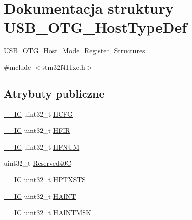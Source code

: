 \hypertarget{struct_u_s_b___o_t_g___host_type_def}{}\section{Dokumentacja struktury U\+S\+B\+\_\+\+O\+T\+G\+\_\+\+Host\+Type\+Def}
\label{struct_u_s_b___o_t_g___host_type_def}


U\+S\+B\+\_\+\+O\+T\+G\+\_\+\+Host\+\_\+\+Mode\+\_\+\+Register\+\_\+\+Structures.  




{\ttfamily \#include $<$stm32f411xe.\+h$>$}

\subsection*{Atrybuty publiczne}
\begin{DoxyCompactItemize}
\item 
\hyperlink{core__sc300_8h_aec43007d9998a0a0e01faede4133d6be}{\+\_\+\+\_\+\+IO} uint32\+\_\+t \hyperlink{struct_u_s_b___o_t_g___host_type_def_ab44a72e139c005445aac54e866f7750f}{H\+C\+FG}
\item 
\hyperlink{core__sc300_8h_aec43007d9998a0a0e01faede4133d6be}{\+\_\+\+\_\+\+IO} uint32\+\_\+t \hyperlink{struct_u_s_b___o_t_g___host_type_def_a509fd299e7540892623954ea4dc1313c}{H\+F\+IR}
\item 
\hyperlink{core__sc300_8h_aec43007d9998a0a0e01faede4133d6be}{\+\_\+\+\_\+\+IO} uint32\+\_\+t \hyperlink{struct_u_s_b___o_t_g___host_type_def_ab4f17f7ef96cf4933e30b1950925c613}{H\+F\+N\+UM}
\item 
uint32\+\_\+t \hyperlink{struct_u_s_b___o_t_g___host_type_def_a0d4a262443e6d12c065adcafabf787ee}{Reserved40C}
\item 
\hyperlink{core__sc300_8h_aec43007d9998a0a0e01faede4133d6be}{\+\_\+\+\_\+\+IO} uint32\+\_\+t \hyperlink{struct_u_s_b___o_t_g___host_type_def_af095d2e3da9e07f63ed7da99276eaaca}{H\+P\+T\+X\+S\+TS}
\item 
\hyperlink{core__sc300_8h_aec43007d9998a0a0e01faede4133d6be}{\+\_\+\+\_\+\+IO} uint32\+\_\+t \hyperlink{struct_u_s_b___o_t_g___host_type_def_af3c15285d6f2efdf4890ea5b27258aca}{H\+A\+I\+NT}
\item 
\hyperlink{core__sc300_8h_aec43007d9998a0a0e01faede4133d6be}{\+\_\+\+\_\+\+IO} uint32\+\_\+t \hyperlink{struct_u_s_b___o_t_g___host_type_def_aa4ec75921a9699f77ee14f377e1b86dc}{H\+A\+I\+N\+T\+M\+SK}
\end{DoxyCompactItemize}


